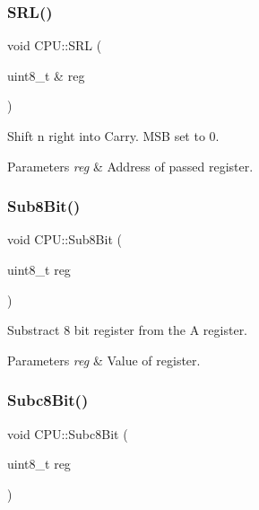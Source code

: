 \subsubsection{\texorpdfstring{S\+R\+L()}{SRL()}}
{\footnotesize\ttfamily void C\+P\+U\+::\+S\+RL (\begin{DoxyParamCaption}\item[{uint8\+\_\+t \&}]{reg }\end{DoxyParamCaption})\hspace{0.3cm}{\ttfamily [private]}}



Shift n right into Carry. M\+SB set to 0. 


\begin{DoxyParams}{Parameters}
{\em reg} & Address of passed register. \\
\hline
\end{DoxyParams}
\mbox{\label{classCPU_af7bbabba611a2d769b00858254d80dd2}} 
\subsubsection{\texorpdfstring{Sub8\+Bit()}{Sub8Bit()}}
{\footnotesize\ttfamily void C\+P\+U\+::\+Sub8\+Bit (\begin{DoxyParamCaption}\item[{uint8\+\_\+t}]{reg }\end{DoxyParamCaption})\hspace{0.3cm}{\ttfamily [private]}}



Substract 8 bit register from the A register. 


\begin{DoxyParams}{Parameters}
{\em reg} & Value of register. \\
\hline
\end{DoxyParams}
\mbox{\label{classCPU_a601e1531c26346cd5e6ac82f57617e6e}} 
\subsubsection{\texorpdfstring{Subc8\+Bit()}{Subc8Bit()}}
{\footnotesize\ttfamily void C\+P\+U\+::\+Subc8\+Bit (\begin{DoxyParamCaption}\item[{uint8\+\_\+t}]{reg }\end{DoxyParamCaption})\hspace{0.3cm}{\ttfamily [private]}}



